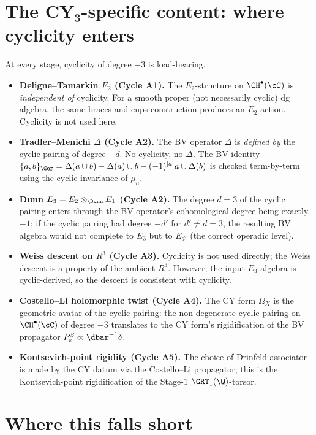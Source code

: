 \section*{The CY$_3$-specific content: where cyclicity enters}

At every stage, cyclicity of degree $-3$ is load-bearing.

\begin{itemize}
\item\textbf{Deligne--Tamarkin $E_2$ (Cycle A1).} The $E_2$-structure
on $\CH^\bullet(\cC)$ is \emph{independent of} cyclicity. For a smooth
proper (not necessarily cyclic) dg algebra, the same braces-and-cups
construction produces an $E_2$-action. Cyclicity is not used here.
\item\textbf{Tradler--Menichi $\Delta$ (Cycle A2).} The BV operator
$\Delta$ is \emph{defined by} the cyclic pairing of degree $-d$. No
cyclicity, no $\Delta$. The BV identity
$\{a,b\}_\Ger=\Delta(a\cup b)-\Delta(a)\cup b-(-1)^{|a|}a\cup\Delta(b)$
is checked term-by-term using the cyclic invariance of $\mu_n$.
\item\textbf{Dunn $E_3 = E_2\otimes_\Dunn E_1$ (Cycle A2).} The
degree $d=3$ of the cyclic pairing enters through the BV operator's
cohomological degree being exactly $-1$; if the cyclic pairing had
degree $-d'$ for $d'\neq d=3$, the resulting BV algebra would not
complete to $E_3$ but to $E_{d'}$ (the correct operadic level).
\item\textbf{Weiss descent on $R^3$ (Cycle A3).} Cyclicity is not used
directly; the Weiss descent is a property of the ambient $R^3$.
However, the input $E_3$-algebra is cyclic-derived, so the descent is
consistent with cyclicity.
\item\textbf{Costello--Li holomorphic twist (Cycle A4).} The CY form
$\Omega_X$ is the geometric avatar of the cyclic pairing: the
non-degenerate cyclic pairing on $\CH^\bullet(\cC)$ of degree $-3$
translates to the CY form's rigidification of the BV propagator
$P^\beta_\varepsilon\propto\dbar^{-1}\delta$.
\item\textbf{Kontsevich-point rigidity (Cycle A5).} The choice of
Drinfeld associator is made by the CY datum via the Costello--Li
propagator; this is the Kontsevich-point rigidification of the
Stage-$1$ $\GRT_1(\Q)$-torsor.
\end{itemize}

\section*{Where this falls short}


